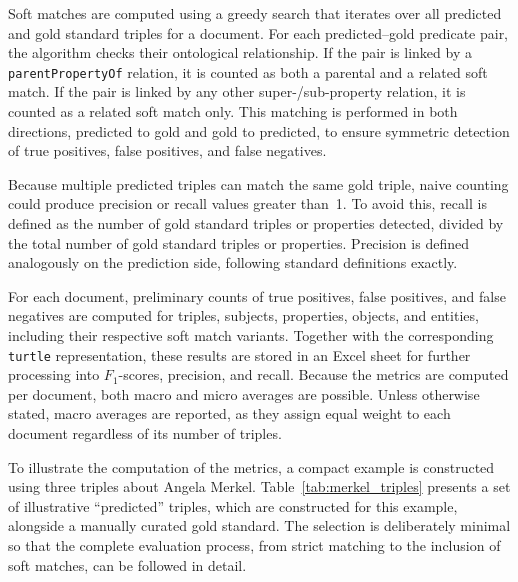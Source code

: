\documentclass[a4paper,oneside,bibliography=totoc]{scrbook}
\begin{document}
Soft matches are computed using a greedy search that iterates over all predicted and gold standard triples for a document. For each predicted–gold predicate pair, the algorithm checks their ontological relationship. If the pair is linked by a \texttt{parentPropertyOf} relation, it is counted as both a parental and a related soft match. If the pair is linked by any other super-/sub-property relation, it is counted as a related soft match only. This matching is performed in both directions, predicted to gold and gold to predicted, to ensure symmetric detection of true positives, false positives, and false negatives.

Because multiple predicted triples can match the same gold triple, naive counting could produce precision or recall values greater than~1. To avoid this, recall is defined as the number of gold standard triples or properties detected, divided by the total number of gold standard triples or properties. Precision is defined analogously on the prediction side, following standard definitions exactly.

For each document, preliminary counts of true positives, false positives, and false negatives are computed for triples, subjects, properties, objects, and entities, including their respective soft match variants. Together with the corresponding \texttt{turtle} representation, these results are stored in an Excel sheet for further processing into $F_1$-scores, precision, and recall. Because the metrics are computed per document, both macro and micro averages are possible. Unless otherwise stated, macro averages are reported, as they assign equal weight to each document regardless of its number of triples.

To illustrate the computation of the metrics, a compact example is constructed using three triples about Angela Merkel. Table~\ref{tab:merkel_triples} presents a set of illustrative \enquote{predicted} triples, which are constructed for this example, alongside a manually curated gold standard. The selection is deliberately minimal so that the complete evaluation process, from strict matching to the inclusion of soft matches, can be followed in detail.
\end{document}
